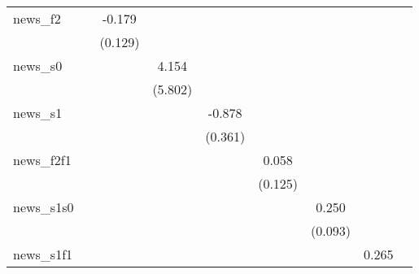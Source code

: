 {\begin{tabular}{l*{8}{c}}
\addlinespace
news\_f2     &                     &      -0.179         &                     &                     &                     &                     &                     &                     \\
            &                     &     (0.129)         &                     &                     &                     &                     &                     &                     \\
\addlinespace
news\_s0     &                     &                     &       4.154         &                     &                     &                     &                     &                     \\
            &                     &                     &     (5.802)         &                     &                     &                     &                     &                     \\
\addlinespace
news\_s1     &                     &                     &                     &      -0.878\sym{**} &                     &                     &                     &                     \\
            &                     &                     &                     &     (0.361)         &                     &                     &                     &                     \\
\addlinespace
news\_f2f1   &                     &                     &                     &                     &       0.058         &                     &                     &                     \\
            &                     &                     &                     &                     &     (0.125)         &                     &                     &                     \\
\addlinespace
news\_s1s0   &                     &                     &                     &                     &                     &       0.250\sym{***}&                     &                     \\
            &                     &                     &                     &                     &                     &     (0.093)         &                     &                     \\
\addlinespace
news\_s1f1   &                     &                     &                     &                     &                     &                     &       0.265         &                     \\

\end{tabular}}
